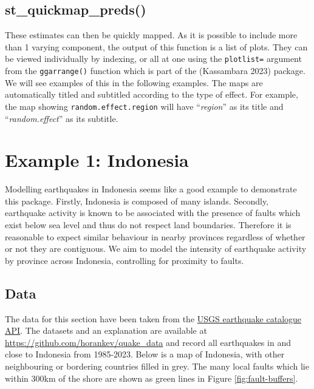 \hypertarget{st_quickmap_preds}{%
\subsection{st\_quickmap\_preds()}\label{st_quickmap_preds}}

These estimates can then be quickly mapped. As it is possible to include more than 1 varying component, the output of this function is a list of plots. They can be viewed individually by indexing, or all at one using the \texttt{plotlist=} argument from the \texttt{ggarrange()} function which is part of the  (Kassambara 2023) package. We will see examples of this in the following examples. The maps are automatically titled and subtitled according to the type of effect. For example, the map showing \texttt{random.effect.region} will have ``\emph{region}'' as its title and ``\emph{random.effect}'' as its subtitle.

\hypertarget{example-1-indonesia}{%
\section{Example 1: Indonesia}\label{example-1-indonesia}}

Modelling earthquakes in Indonesia seems like a good example to
demonstrate this package. Firstly, Indonesia is composed of many
islands. Secondly, earthquake activity is known to be associated with
the presence of faults which exist below sea level and thus do not
respect land boundaries. Therefore it is reasonable to expect similar
behaviour in nearby provinces regardless of whether or not they are
contiguous. We aim to model the intensity of earthquake activity by
province across Indonesia, controlling for proximity to faults.

\hypertarget{data}{%
\subsection{Data}\label{data}}

The data for this section have been taken from the \href{https://earthquake.usgs.gov/earthquakes/search/}{USGS earthquake
catalogue API}. The
datasets and an explanation are available at
\url{https://github.com/horankev/quake_data} and record all earthquakes in
and close to Indonesia from 1985-2023. Below is a map of Indonesia, with
other neighbouring or bordering countries filled in grey. The many local
faults which lie within 300km of the shore are shown as green lines
in Figure \ref{fig:fault-buffers}.

